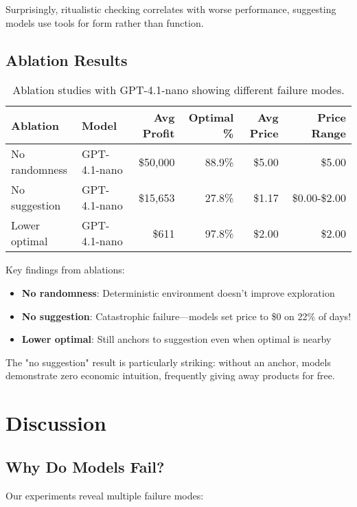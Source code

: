 \documentclass[11pt]{article}
\begin{document}
Surprisingly, ritualistic checking correlates with worse performance, suggesting models use tools for form rather than function.

\subsection{Ablation Results}

\begin{table}[h]
\centering
\begin{tabular}{llrrrr}
\toprule
Ablation & Model & Avg Profit & Optimal \% & Avg Price & Price Range \\
\midrule
No randomness & GPT-4.1-nano & \$50,000 & 88.9\% & \$5.00 & \$5.00 \\
No suggestion & GPT-4.1-nano & \$15,653 & 27.8\% & \$1.17 & \$0.00-\$2.00 \\
Lower optimal & GPT-4.1-nano & \$611 & 97.8\% & \$2.00 & \$2.00 \\
\bottomrule
\end{tabular}
\caption{Ablation studies with GPT-4.1-nano showing different failure modes.}
\label{tab:ablations}
\end{table}

Key findings from ablations:

\begin{itemize}
    \item \textbf{No randomness}: Deterministic environment doesn't improve exploration
    \item \textbf{No suggestion}: Catastrophic failure—models set price to \$0 on 22\% of days!
    \item \textbf{Lower optimal}: Still anchors to suggestion even when optimal is nearby
\end{itemize}

The "no suggestion" result is particularly striking: without an anchor, models demonstrate zero economic intuition, frequently giving away products for free.

\section{Discussion}

\subsection{Why Do Models Fail?}

Our experiments reveal multiple failure modes:
\end{document}
